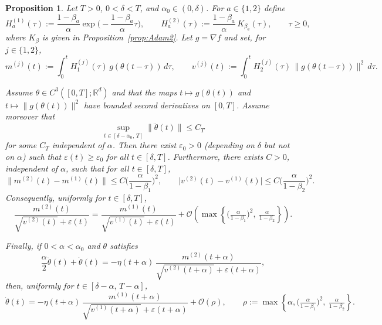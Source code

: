 \documentclass[10pt,a4paper]{amsart}
\newtheorem{proposition}{Proposition}
\begin{document}
\begin{proposition}\label{prop:alpha-recovery}
Let $T>0$, $0<\delta<T$, and $\alpha_0\in(0,\delta)$. For $a\in\{1,2\}$ define
\[
H^{(1)}_a(\tau):=\frac{1-\beta_a}{\alpha}\exp\!\Big(-\frac{1-\beta_a}{\alpha}\tau\Big),
\qquad
H^{(2)}_a(\tau):=\frac{1-\beta_a}{\alpha}\,K_{\beta_a}(\tau),
\qquad \tau\ge 0,
\]
where $K_\beta$ is given in Proposition~\ref{prop:Adam2}. Let $g=\nabla f$ and set, for $j\in\{1,2\}$,
\[
m^{(j)}(t):=\int_0^t H^{(j)}_1(\tau)\,g(\theta(t-\tau))\,d\tau,
\qquad
v^{(j)}(t):=\int_0^t H^{(j)}_2(\tau)\,\|g(\theta(t-\tau))\|^2\,d\tau .
\]

Assume $\theta\in C^3([0,T];\mathbb R^d)$ and that the maps $t\mapsto g(\theta(t))$ and $t\mapsto \|g(\theta(t))\|^2$ have bounded second derivatives on $[0,T]$.
Assume moreover that
\[
\sup_{t\in[\delta-\alpha_0,\,T]}\|\ddot\theta(t)\|\le C_T
\]
for some $C_T$ independent of $\alpha$. Then there exist $\varepsilon_0>0$ (depending on $\delta$ but not on $\alpha$) such that $\varepsilon(t)\ge \varepsilon_0$ for all $t\in[\delta,T]$. Furthermore, there exists $C>0$, independent of $\alpha$, such that for all $t\in[\delta,T]$,
\[
\|m^{(2)}(t)-m^{(1)}(t)\|
\le C\Big(\frac{\alpha}{1-\beta_1}\Big)^{2},
\qquad
\bigl|v^{(2)}(t)-v^{(1)}(t)\bigr|
\le C\Big(\frac{\alpha}{1-\beta_2}\Big)^{2}.
\]
Consequently, uniformly for $t\in[\delta,T]$,
\[
\frac{m^{(2)}(t)}{\sqrt{v^{(2)}(t)}+\varepsilon(t)}
=
\frac{m^{(1)}(t)}{\sqrt{v^{(1)}(t)}+\varepsilon(t)}
+\mathcal{O}\!\left(\max\left\{\Big(\tfrac{\alpha}{1-\beta_1}\Big)^2,\ \tfrac{\alpha}{1-\beta_2}\right\}\right).
\]

Finally, if $0<\alpha<\alpha_0$ and $\theta$ satisfies
\[
\frac{\alpha}{2}\ddot\theta(t)+\dot\theta(t)
=
-\eta(t+\alpha)\,
\frac{m^{(2)}(t+\alpha)}{\sqrt{v^{(2)}(t+\alpha)}+\varepsilon(t+\alpha)},
\]
then, uniformly for $t\in[\delta-\alpha,\,T-\alpha]$,
\[
\dot\theta(t)
=
-\eta(t+\alpha)\,
\frac{m^{(1)}(t+\alpha)}{\sqrt{v^{(1)}(t+\alpha)}+\varepsilon(t+\alpha)}
+\mathcal{O}(\rho),
\qquad
\rho:=\max\left\{\alpha,\Big(\tfrac{\alpha}{1-\beta_1}\Big)^2,\ \tfrac{\alpha}{1-\beta_2}\right\}.
\]
\end{proposition}
\end{document}
